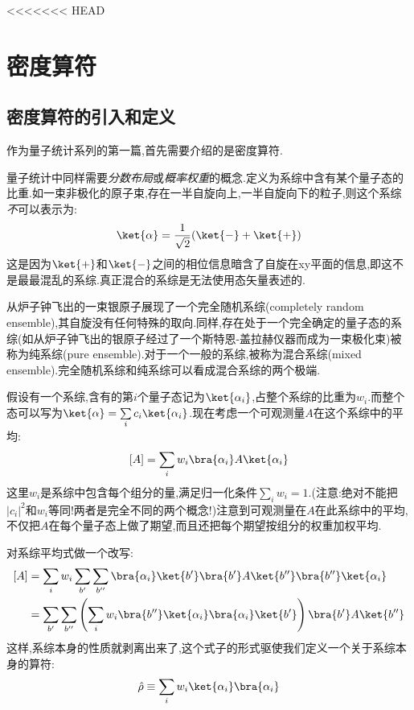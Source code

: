 <<<<<<< HEAD

\section{密度算符}
\subsection{密度算符的引入和定义}
    作为量子统计系列的第一篇,首先需要介绍的是密度算符.
    
    \vspace*{0.5cm} 

    量子统计中同样需要\emph{分数布局}或\emph{概率权重}的概念.定义为系综中含有某个量子态的比重.如一束非极化的原子束,存在一半自旋向上,一半自旋向下的粒子,则这个系综\emph{不}可以表示为:
    \[\ket{\alpha}=\frac{1}{\sqrt{2}}(\ket{-}+\ket{+})\]
    这是因为$\ket{+}$和$\ket{-}$之间的相位信息暗含了自旋在xy平面的信息,即这不是最最混乱的系综.真正混合的系综是无法使用态矢量表述的.

    从炉子钟飞出的一束银原子展现了一个完全随机系综(completely random ensemble),其自旋没有任何特殊的取向.同样,存在处于一个完全确定的量子态的系综(如从炉子钟飞出的银原子经过了一个斯特恩-盖拉赫仪器而成为一束极化束)被称为纯系综(pure ensemble).对于一个一般的系综,被称为混合系综(mixed ensemble).完全随机系综和纯系综可以看成混合系综的两个极端.

    \vspace*{1cm}

    假设有一个系综,含有的第$i$个量子态记为$\ket{\alpha_i}$,占整个系综的比重为$w_i$.而整个态可以写为$\ket{\alpha}=\sum\limits_i c_i \ket{\alpha_i}$.现在考虑一个可观测量$A$在这个系综中的平均:
    \[[A]=\sum_i w_i \bra{\alpha_i}A\ket{\alpha_i}\]
    这里$w_i$是系综中包含每个组分的量,满足归一化条件$\sum\limits_i w_i=1$.(注意:绝对不能把$\left\vert c_i \right\vert ^{2}$和$w_i$等同!两者是完全不同的两个概念!)注意到可观测量在$A$在此系综中的平均,不仅把$A$在每个量子态上做了期望,而且还把每个期望按组分的权重加权平均.

    \vspace*{0.5cm}

    对系综平均式做一个改写:
    \begin{align*}
     \left[ A \right] &=\sum_i w_i \sum_{b'}\sum_{b''}\bra{\alpha_i}\ket{b'}\bra{b'}A\ket{b''}\bra{b''}\ket{\alpha_i}\\ 
     &=\sum_{b'}\sum_{b''}\left( \sum_i w_i \bra{b''}\ket{\alpha_i}\bra{\alpha_i}\ket{b'} \right) \bra{b'}A\ket{b''}
    \end{align*}
    这样,系综本身的性质就剥离出来了,这个式子的形式驱使我们定义一个关于系综本身的算符:
    \begin{equation}
      \hat{\rho}\equiv \sum_i w_i \ket{\alpha_i}\bra{\alpha_i}
    \end{equation}
    
